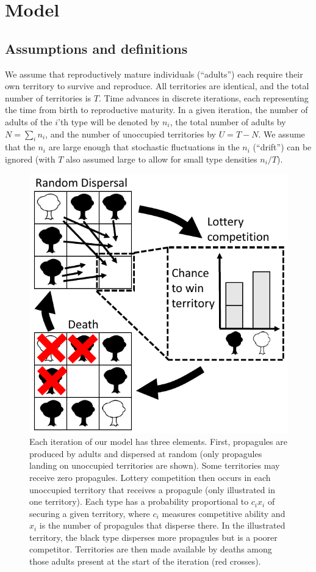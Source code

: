 \documentclass[12pt]{article}
\begin{document}
\section*{Model}\label{sec:model}

\subsection*{Assumptions and definitions} 

We assume that reproductively mature individuals (``adults'') each require their own territory to survive and reproduce. All territories are identical, and the total number of territories is $T$. Time advances in discrete iterations, each representing the time from birth to reproductive maturity. In a given iteration, the number of adults of the $i$'th type will be denoted by $n_i$, the total number of adults by $N=\sum_i n_i$, and the number of unoccupied territories by $U=T-N$. We assume that the $n_i$ are large enough that stochastic fluctuations in the $n_i$ (``drift'') can be ignored (with $T$ also assumed large to allow for small type densities $n_i/T$).

\begin{figure}
\centering
\includegraphics[scale=0.8]{lottery.pdf}
\caption{\label{fig:lottery} Each iteration of our model has three elements. First, propagules are produced by adults and dispersed at random (only propagules landing on unoccupied territories are shown). Some territories may receive zero propagules. Lottery competition then occurs in each unoccupied territory that receives a propagule (only illustrated in one territory). Each type has a probability proportional to $c_i x_i$ of securing a given territory, where $c_i$ measures competitive ability and $x_i$ is the number of propagules that disperse there. In the illustrated territory, the black type disperses more propagules but is a poorer competitor. Territories are then made available by deaths among those adults present at the start of the iteration (red crosses).}
\end{figure}
\end{document}
